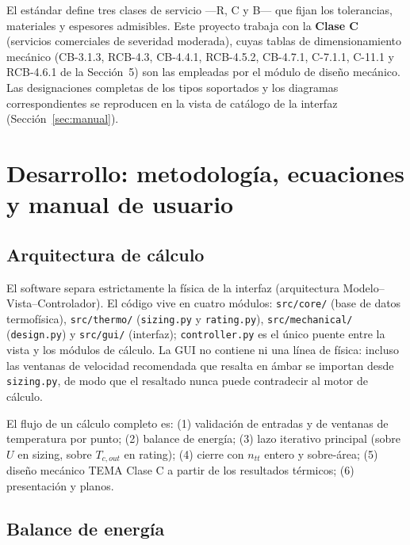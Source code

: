 \documentclass[11pt,a4paper]{article}
\begin{document}
El est\'andar define tres clases de servicio ---R, C y B--- que fijan los
tolerancias, materiales y espesores admisibles. Este proyecto trabaja con la
\textbf{Clase C} (servicios comerciales de severidad moderada), cuyas tablas de
dimensionamiento mec\'anico (CB-3.1.3, RCB-4.3, CB-4.4.1, RCB-4.5.2, CB-4.7.1,
C-7.1.1, C-11.1 y RCB-4.6.1 de la Secci\'on~5) son las empleadas por el
m\'odulo de dise\~no mec\'anico. Las designaciones completas de los tipos
soportados y los diagramas correspondientes se reproducen en la vista de
cat\'alogo de la interfaz (Secci\'on~\ref{sec:manual}).

\section{Desarrollo: metodolog\'ia, ecuaciones y manual de usuario}
\label{sec:desarrollo}

\subsection{Arquitectura de c\'alculo}

El software separa estrictamente la f\'isica de la interfaz (arquitectura
Modelo--Vista--Controlador). El c\'odigo vive en cuatro m\'odulos:
\texttt{src/core/} (base de datos termof\'isica), \texttt{src/thermo/}
(\texttt{sizing.py} y \texttt{rating.py}), \texttt{src/mechanical/}
(\texttt{design.py}) y \texttt{src/gui/} (interfaz); \texttt{controller.py} es
el \'unico puente entre la vista y los m\'odulos de c\'alculo. La GUI no
contiene ni una l\'inea de f\'isica: incluso las ventanas de velocidad
recomendada que resalta en \'ambar se importan desde \texttt{sizing.py}, de modo
que el resaltado nunca puede contradecir al motor de c\'alculo.

El flujo de un c\'alculo completo es: (1) validaci\'on de entradas y de
ventanas de temperatura por punto; (2) balance de energ\'ia; (3) lazo iterativo
principal (sobre $U$ en sizing, sobre $T_{c,out}$ en rating); (4) cierre con
$n_{tt}$ entero y sobre-\'area; (5) dise\~no mec\'anico TEMA Clase C a partir de
los resultados t\'ermicos; (6) presentaci\'on y planos.

\subsection{Balance de energ\'ia}
\end{document}
